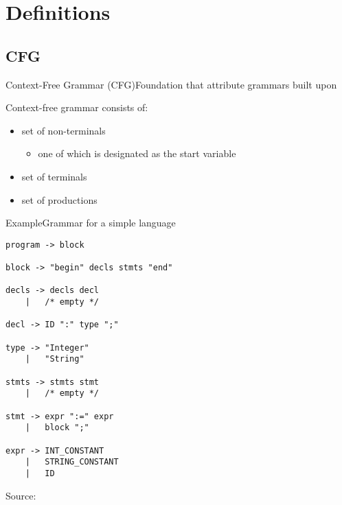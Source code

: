 
\section{Definitions}

\subsection*{CFG}{}

\begin{frame}{Context-Free Grammar (CFG)}{Foundation that attribute grammars built upon}

Context-free grammar consists of:
\begin{itemize}
    \item set of \alert{non-terminals}
    \begin{itemize}
        \item one of which is designated as the start variable
    \end{itemize}
    \item set of \alert{terminals}
    \item set of \alert{productions}
\end{itemize}
\end{frame}


\begin{frame}[fragile=singleslide]{Example}{Grammar for a simple language}

\begin{multicols}{2}
\begin{Verbatim}[fontsize=\scriptsize]
program -> block

block -> "begin" decls stmts "end"

decls -> decls decl
    |   /* empty */

decl -> ID ":" type ";"

type -> "Integer"
    |   "String"

stmts -> stmts stmt
    |   /* empty */

stmt -> expr ":=" expr
    |   block ";"

expr -> INT_CONSTANT
    |   STRING_CONSTANT
    |   ID
\end{Verbatim}
\end{multicols}


Source: \cite{Boyland1998AnalyzingDN}

\end{frame}

